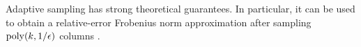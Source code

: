 Adaptive sampling has strong theoretical guarantees. In particular, it can be used to obtain a relative-error Frobenius norm approximation after sampling $\operatorname*{poly}(k, 1/\epsilon)$ columns  \cite{deshpande_adaptive_2006}. 

